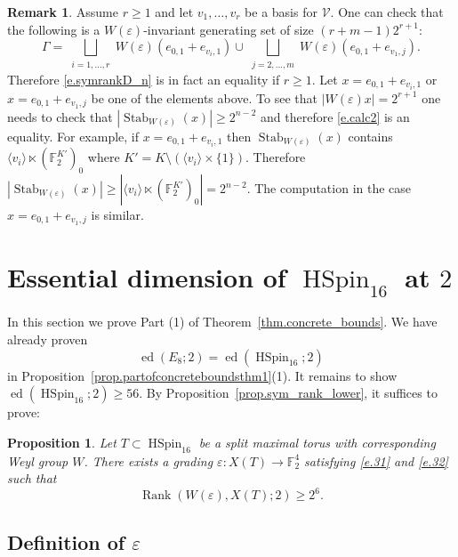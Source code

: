 \documentclass[12pt]{amsart}
\numberwithin{equation}{section}
\newtheorem{proposition}[theorem]{Proposition}
\theoremstyle{definition}
\newtheorem{remark}[theorem]{Remark}
\newcommand{\cV}{\mathcal{V}}
\newcommand{\bF}{\mathbb{F}}
\newcommand{\ed}{\operatorname{ed}}
\newcommand{\SymRank}{\operatorname{Rank}}
\newcommand{\Stab}{\operatorname{Stab}}
\newcommand{\eps}{\varepsilon}
\newcommand{\HSpin}{\operatorname{HSpin}}
\begin{document}
\begin{remark}
  Assume $r \geq 1$ and let ${v_1,\dots, v_r}$ be  a basis for $\cV$. One can check that the following is a $W(\eps)$-invariant generating set of size $(r+m-1)2^{r+1}$:
    $$\Gamma = \bigsqcup_{\begin{matrix} i = 1,\dots,r \end{matrix}} W(\eps)( e_{0,1} + e_{v_i,1}) \cup \bigsqcup_{\begin{matrix} j = 2,\dots,m \end{matrix}} W(\eps)( e_{0,1} + e_{v_1,j}).$$
    Therefore \eqref{e.symrankD_n} is in fact an equality if $r\geq 1$. Let $x=e_{0,1} +e_{v_i,1}$ or $x= e_{0,1}+e_{v_1,j}$ be one of the elements above. To see that $|W(\eps)x| =2^{r+1}$ one needs to check that $|\Stab_{W(\eps)}(x)|\geq 2^{n-2}$ and therefore \eqref{e.calc2} is an equality. For example, if $x = e_{0,1}+e_{v_i,1}$ then $\Stab_{W(\eps)}(x)$ contains $\langle v_i\rangle\ltimes (\bF_2^{K'})_0$ where $K' = K\setminus (\langle v_i \rangle\times \{1\})$. Therefore $|\Stab_{W(\eps)}(x)|\geq | \langle v_i\rangle\ltimes (\bF_2^{K'})_0| = 2^{ n -2}$. The computation in the case $x = e_{0,1}+e_{v_1,j}$ is similar. 
\end{remark}

\section{Essential dimension of \texorpdfstring{$\HSpin_{16}$ at $2$}{HSpin16}}

  In this section we prove Part (1) of Theorem~\ref{thm.concrete_bounds}. We have already proven $$\ed(E_8;2)= \ed(\HSpin_{16};2)$$ in Proposition~\ref{prop.partofconcreteboundsthm1}(1). It remains to show $\ed(\HSpin_{16};2)\geq 56$. By Proposition~\ref{prop.sym_rank_lower}, it suffices to prove:
\begin{proposition}\label{prop.rank_Hspin}
Let $T\subset \HSpin_{16}$ be a split maximal torus with corresponding Weyl group $W$. There exists a grading $\eps:X(T) \to \bF_2^{4}$ satisfying \eqref{e.31} and \eqref{e.32} such that
    \begin{equation}\label{e.symrankHspin}
    \SymRank(W(\eps),X(T);2) \geq 2^6.
\end{equation}
\end{proposition}

\subsection*{Definition of \texorpdfstring{$\eps$}{epsilon}}
\end{document}
